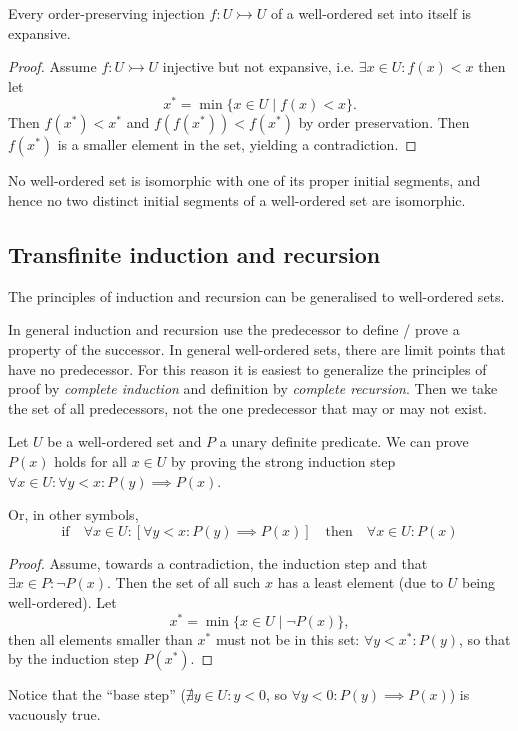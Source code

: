 \begin{proposition} \label{prop:injectionsExpansive}
Every order-preserving injection $f: U\rightarrowtail U$ of a well-ordered set into itself is expansive.
\end{proposition}
\begin{proof}
Assume $f: U\rightarrowtail U$ injective but not expansive, i.e. $\exists x\in U: f(x)<x$ then let
\[ x^* = \min\{x\in U\;|\;f(x)<x\}. \]
Then $f(x^*)<x^*$ and $f(f(x^*)) < f(x^*)$ by order preservation. Then $f(x^*)$ is a smaller element in the set, yielding a contradiction.
\end{proof}
\begin{corollary} \label{corollary:properInitialSegmentNotIsomorphic}
No well-ordered set is isomorphic with one of its proper initial
segments, and hence no two distinct initial segments of a well-ordered set are
isomorphic.
\end{corollary}


\subsection{Transfinite induction and recursion}
The principles of induction and recursion can be generalised to well-ordered sets.

In general induction and recursion use the predecessor to define / prove a property of the successor. In general well-ordered sets, there are limit points that have no predecessor. For this reason it is easiest to generalize the principles of proof by \textit{complete
induction} and definition by \textit{complete recursion}. Then we take the set of all predecessors, not the one predecessor that may or may not exist.

\begin{theorem}
Let $U$ be a well-ordered set and $P$ a unary definite predicate. We can prove $P(x)$ holds for all $x\in U$ by proving the strong induction step $\forall x\in U: \forall y<x: P(y)\implies P(x)$.

Or, in other symbols,
\[ \text{if}\quad  \forall x\in U: \left[\forall y < x: P(y)\implies P(x)\right] \quad \text{then}\quad \forall x\in U: P(x) \]
\end{theorem}
\begin{proof}
Assume, towards a contradiction, the induction step and that $\exists x\in P: \neg P(x)$. Then the set of all such $x$ has a least element (due to $U$ being well-ordered). Let
\[ x^* = \min\{ x\in U\;|\; \neg P(x) \}, \]
then all elements smaller than $x^*$ must not be in this set: $\forall y<x^*: P(y)$, so that by the induction step $P(x^*)$.
\end{proof}
Notice that the ``base step'' ($\nexists y\in U: y<0$, so $\forall y<0: P(y)\implies P(x)$) is vacuously true.

